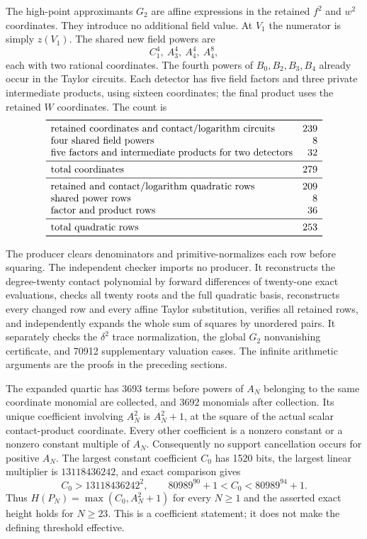 \documentclass[11pt,a4paper]{article}
\begin{document}
The high-point approximants $G_2$ are affine expressions in the
retained $f^2$ and $w^2$ coordinates. They introduce no additional
field value. At $V_1$ the numerator is simply $z(V_1)$.
The shared new field powers are
\[
                       C_1^4,\ A_3^4,\ A_4^4,\ A_4^8,
\]
each with two rational coordinates. The fourth powers of
$B_0,B_2,B_3,B_4$ already occur in the Taylor circuits.
Each detector has five field factors and three private intermediate
products, using sixteen coordinates; the final product uses the
retained $W$ coordinates. The count is
\[
\begin{array}{lr}\toprule
\text{retained coordinates and contact/logarithm circuits}&239\\
\text{four shared field powers}&8\\
\text{five factors and intermediate products for two detectors}&32\\\midrule
\text{total coordinates}&279\\\midrule
\text{retained and contact/logarithm quadratic rows}&209\\
\text{shared power rows}&8\\
\text{factor and product rows}&36\\\midrule
\text{total quadratic rows}&253\\\bottomrule
\end{array}
\]

The producer clears denominators and primitive-normalizes each row
before squaring. The independent checker imports no producer. It
reconstructs the degree-twenty contact polynomial by forward differences
of twenty-one exact evaluations, checks all twenty roots and the full
quadratic basis, reconstructs every changed row and every affine Taylor
substitution, verifies all retained rows, and independently expands the
whole sum of squares by unordered pairs. It separately checks the
$\delta^2$ trace normalization, the global $G_2$ nonvanishing certificate,
and 70912 supplementary valuation cases. The infinite arithmetic
arguments are the proofs in the preceding sections.

The expanded quartic has 3693 terms before powers of $A_N$ belonging
to the same coordinate monomial are collected, and 3692 monomials
after collection. Its unique coefficient involving $A_N^2$ is
$A_N^2+1$, at the square of the actual scalar contact-product coordinate.
Every other coefficient is a nonzero constant or a nonzero constant
multiple of $A_N$. Consequently no support cancellation occurs for
positive $A_N$. The largest constant coefficient $C_0$ has 1520 bits,
the largest linear multiplier is $13118436242$, and exact comparison
gives
\[
 C_0>13118436242^2,\qquad
 80989^{90}+1<C_0<80989^{94}+1.
\]
Thus $H(P_N)=\max(C_0,A_N^2+1)$ for every $N\ge1$ and the asserted
exact height holds for $N\ge23$. This is a coefficient statement;
it does not make the defining threshold effective.
\end{document}
